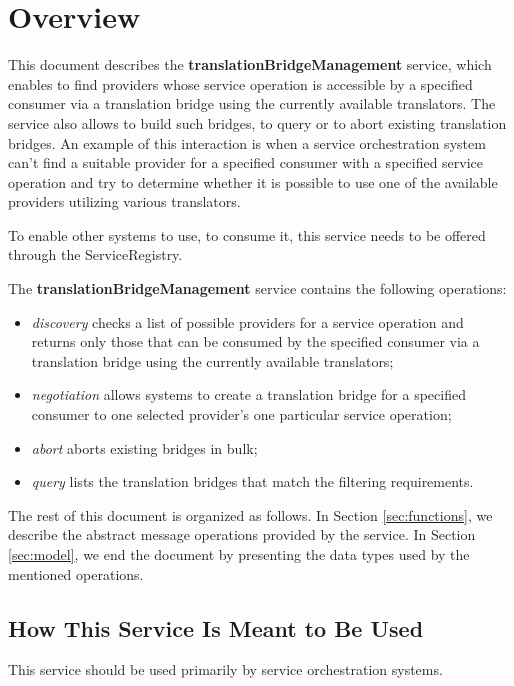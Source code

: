 \documentclass[a4paper]{arrowhead}
\begin{document}
\section{Overview}
\label{sec:overview}
This document describes the \textbf{translationBridgeManagement} service, which enables to find providers whose service operation is accessible by a specified consumer via a translation bridge using the currently available translators. The service also allows to build such bridges, to query or to abort existing translation bridges. An example of this interaction is when a service orchestration system can't find a suitable provider for a specified consumer with a specified service operation and try to determine whether it is possible to use one of the available providers utilizing various translators.

To enable other systems to use, to consume it, this service needs to be offered through the ServiceRegistry.

The \textbf{translationBridgeManagement} service contains the following operations:

\begin{itemize}
    \item \textit{discovery} checks a list of possible providers for a service operation and returns only those that can be consumed by the specified consumer via a translation bridge using the currently available translators;
    \item \textit{negotiation} allows systems to create a translation bridge for a specified consumer to one selected provider's one particular service operation;
    \item \textit{abort} aborts existing bridges in bulk;
    \item \textit{query} lists the translation bridges that match the filtering requirements.
\end{itemize}

The rest of this document is organized as follows.
In Section \ref{sec:functions}, we describe the abstract message operations provided by the service.
In Section \ref{sec:model}, we end the document by presenting the data types used by the mentioned operations.

\subsection{How This Service Is Meant to Be Used}

This service should be used primarily by service orchestration systems.
\end{document}
